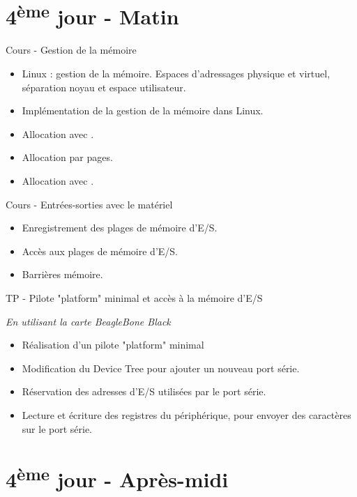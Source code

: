 \documentclass[a4paper,12pt,obeyspaces,spaces,hyphens]{article}
\begin{document}
\section{4\textsuperscript{ème} jour - Matin}

\feagendatwocolumn
{Cours - Gestion de la mémoire}
{
  \begin{itemize}
  \item Linux : gestion de la mémoire. Espaces d'adressages physique et
     virtuel, séparation noyau et espace utilisateur.
  \item Implémentation de la gestion de la mémoire dans Linux.
  \item Allocation avec .
  \item Allocation par pages.
  \item Allocation avec .
  \end{itemize}
}
{Cours - Entrées-sorties avec le matériel}
{
  \begin{itemize}
  \item Enregistrement des plages de mémoire d'E/S.
  \item Accès aux plages de mémoire d'E/S.
  \item Barrières mémoire.
  \end{itemize}
}

\feagendaonecolumn
{TP - Pilote "platform" minimal et accès à la mémoire d'E/S}
{
  {\em En utilisant la carte BeagleBone Black}
  \begin{itemize}
  \item Réalisation d'un pilote "platform" minimal
  \item Modification du Device Tree pour ajouter un nouveau
    port série.
  \item Réservation des adresses d'E/S utilisées par le port série.
  \item Lecture et écriture des registres du périphérique, pour
    envoyer des caractères sur le port série.
  \end{itemize}
}

\section{4\textsuperscript{ème} jour - Après-midi}
\end{document}
